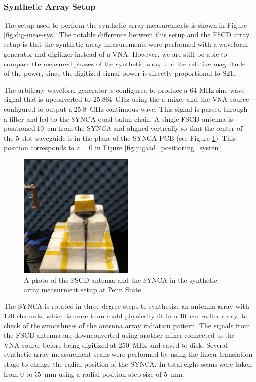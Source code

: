 \subsubsection{Synthetic Array Setup}

The setup used to perform the synthetic array measurements is shown in Figure \ref{fig:dig-meas-sys}. The notable difference between this setup and the FSCD array setup is that the synthetic array measurements were performed with a waveform generator and digitizer instead of a VNA. However, we are still be able to compare the measured phases of the synthetic array and the relative magnitude of the power, since the digitized signal power is directly proportional to S21. 

The arbitrary waveform generator is configured to produce a 64 MHz sine wave signal that is upconverted to 25.864~GHz using the a mixer and the VNA source configured to output a 25.8~GHz continuous wave. This signal is passed through a filter and fed to the SYNCA quad-balun chain. A single FSCD antenna is positioned 10~cm from the SYNCA and aligned vertically so that the center of the 5-slot waveguide is in the plane of the SYNCA PCB (see Figure \ref{fig:synth_array_photo}). This position corresponds to $z=0$ in Figure \ref{fig:jugaad_positioning_system}. 
\begin{figure}[htbp]
    \centering
    \includegraphics[width=0.5\textwidth]{figs/Chapter-5/230412_IMG_2756.png}
    \caption{A photo of the FSCD antenna and the SYNCA in the synthetic array measurment setup at Penn State.}
    \label{fig:synth_array_photo}
\end{figure}
The SYNCA is rotated in three degree steps to synthesize an antenna array with 120 channels, which is more than could physically fit in a 10~cm radius array, to check of the smoothness of the antenna array radiation pattern. The signals from the FSCD antenna are downconverted using another mixer connected to the VNA source before being digitized at 250~MHz and saved to disk. Several synthetic array measurement scans were performed by using the linear translation stage to change the radial position of the SYNCA. In total eight scans were taken from 0 to 35~mm using a radial position step size of 5~mm.

